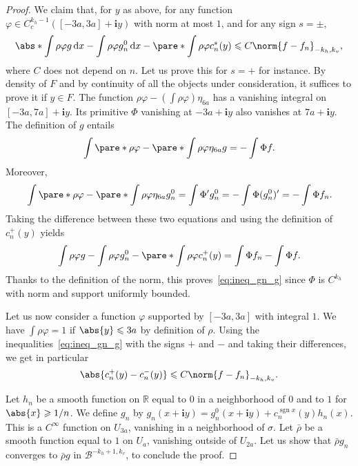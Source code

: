 \documentclass[11pt, a4paper, oneside, final, pagebackref]{amsart}
\newcommand{\boB}{\mathcal{B}}
\newcommand{\R}{\mathbb{R}}
\newcommand{\dd}{\mathop{}\!\mathrm{d}}
\newcommand{\ic}{\mathbf{i}}
\DeclareMathOperator{\sgn}{sgn}
\renewcommand{\phi}{\varphi}
\renewcommand{\leq}{\leqslant}
\renewcommand{\geq}{\geqslant}
\theoremstyle{definition}
\numberwithin{equation}{section}
\begin{document}
\begin{proof}
We claim that, for $y$ as above, for any function $\phi \in C^{k_h-1}_c([-3a,
3a] + \ic y)$ with norm at most $1$, and for any sign $s = \pm$,
\begin{equation}
\label{eq:ineq_gn_g}
  \abs*{\int \rho \phi g \dd x - \int \rho \phi g^0_n \dd x - \pare*{\int \rho \phi} c^s_n(y)}
  \leq C \norm{f-f_n}_{-k_h, k_v},
\end{equation}
where $C$ does not depend on $n$. Let us prove this for $s=+$ for instance.
By density of $F$ and by continuity of all the objects under consideration,
it suffices to prove it if $y\in F$. The function $\rho \phi -(\int \rho
\phi) \eta_{6a}$ has a vanishing integral on $[-3a, 7a] + \ic y$. Its
primitive $\Phi$ vanishing at $-3a + \ic y$ also vanishes at $7a + \ic y$.
The definition of $g$ entails
\begin{equation*}
  \int \pare*{\rho \phi -  \pare*{\int \rho \phi} \eta_{6a}} g = - \int \Phi f.
\end{equation*}
Moreover,
\begin{equation*}
  \int \pare*{\rho \phi -  \pare*{\int \rho \phi} \eta_{6a}} g^0_n = \int \Phi' g^0_n = - \int \Phi (g^0_n)' = -\int \Phi f_n.
\end{equation*}
Taking the difference between these two equations and using the definition of
$c_n^+(y)$ yields
\begin{equation*}
  \int \rho \phi g - \int \rho \phi g^0_n - \pare*{\int \rho \phi} c_n^+(y) = \int \Phi f_n - \int \Phi f.
\end{equation*}
Thanks to the definition of the norm, this proves~\eqref{eq:ineq_gn_g} since
$\Phi$ is $C^{k_h}$ with norm and support uniformly bounded.

Let us now consider a function $\phi$ supported by $[-3a,3a]$ with integral
$1$. We have $\int \rho \phi = 1$ if $\abs{y} \leq 3a$ by definition of
$\rho$. Using the inequalities~\eqref{eq:ineq_gn_g} with the signs $+$ and
$-$ and taking their differences, we get in particular
\begin{equation}
\label{eq:cn_pm_diff}
  \abs{c^+_n(y) - c^-_n(y)} \leq C \norm{f-f_n}_{-k_h, k_v}.
\end{equation}

Let $h_n$ be a smooth function on $\R$ equal to $0$ in a neighborhood of $0$
and to $1$ for $\abs{x} \geq 1/n$. We define $g_n$ by $g_n(x + \ic y) =
g_n^0(x+\ic y) + c_n^{\sgn x}(y) h_n(x)$. This is a $C^\infty$ function on
$U_{3a}$, vanishing in a neighborhood of $\sigma$. Let $\bar\rho$ be a smooth
function equal to $1$ on $U_a$, vanishing outside of $U_{2a}$. Let us show
that $\bar\rho g_n$ converges to $\bar\rho g$ in $\boB^{-k_h+1, k_v}$, to
conclude the proof.


\end{proof}
\end{document}
